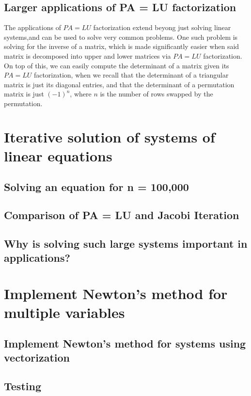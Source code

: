 \documentclass[11pt]{article}
\begin{document}
\subsection{Larger applications of PA = LU factorization}
The applications of $PA = LU$ factorization extend beyong just solving linear systems,and can be used to solve very common problems.
One such problem is solving for the inverse of a matrix, which is made significantly easier when said matrix is decomposed into upper and lower matrices via $PA = LU$ factorization.
On top of this, we can easily compute the determinant of a matrix given its $PA = LU$ factorization, when we recall that the determinant of a triangular matrix is just its diagonal entries, and that the determinant of a permutation matrix is just $(-1)^n$, where $n$ is the number of rows swapped by the permutation.

\section{Iterative solution of systems of linear equations}

\subsection{Solving an equation for n = 100,000}

\subsection{Comparison of PA = LU and Jacobi Iteration}

\subsection{Why is solving such large systems important in applications?}

\section{Implement Newton's method for multiple variables}

\subsection{Implement Newton's method for systems using vectorization}

\subsection{Testing}
\end{document}
